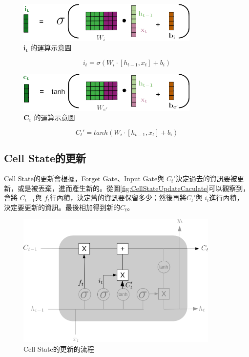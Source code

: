 \begin{figure}[H]
	\centering
	\includegraphics[width=9cm]{./pic/P11XgmjT.png}
	\caption{\(\mathbf{i_t}\) 的運算示意圖}
	\label{fig:InputGateCaculate}
\end{figure}

\begin{equation}
	\label{eqn:InputGateCalculate}
	i_t = \sigma(W_i\cdot[h_{t-1},x_t]+b_i)
\end{equation}

\begin{figure}[H]
	\centering
	\includegraphics[width=9cm]{./pic/EI5hsLBg.png}
	\caption{\(\mathbf{C_t}\) 的運算示意圖}
	\label{fig:InputCalculate}
\end{figure}


\begin{equation}
	\label{eqn:InputCalculate}
	C_t' = tanh(W_i\cdot[h_{t-1},x_t]+b_i)
\end{equation}

\subsection{Cell State的更新}

Cell State的更新會根據，Forget Gate、Input Gate與 \(C_t'\)決定過去的資訊要被更新，或是被丟棄，進而產生新的。從圖\ref{fig:CellStateUpdateCaculate}可以觀察到，會將 \(C_{t-1}\)與 \(f_t\)行內積，決定舊的資訊要保留多少；然後再將\(C_t'\)與 \(i_t\)進行內積，決定要更新的資訊。最後相加得到新的\(C_t\)。

\begin{figure}[H]
	\centering
	\includegraphics[width=10cm]{./pic/rQqms2xi.png}
	\caption{Cell State的更新的流程}
	\label{fig:CellStateUpdate}
\end{figure}


